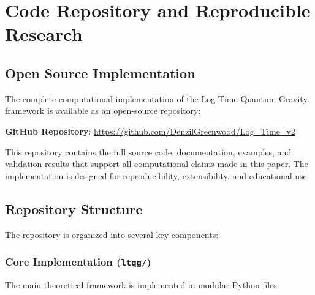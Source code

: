 \section{Code Repository and Reproducible Research}
\label{sec:code_repository}

\subsection{Open Source Implementation}
\label{subsec:open_source}

The complete computational implementation of the Log-Time Quantum Gravity framework is available as an open-source repository:

\begin{center}
\textbf{GitHub Repository}: \url{https://github.com/DenzilGreenwood/Log_Time_v2}
\end{center}

This repository contains the full source code, documentation, examples, and validation results that support all computational claims made in this paper. The implementation is designed for reproducibility, extensibility, and educational use.

\subsection{Repository Structure}
\label{subsec:repository_structure}

The repository is organized into several key components:

\subsubsection{Core Implementation (\texttt{ltqg/})}

The main theoretical framework is implemented in modular Python files:

